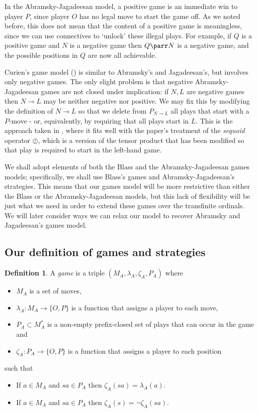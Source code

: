 \documentclass[11pt]{article} %
\theoremstyle{plain} %
\theoremstyle{definition} %
\newtheorem{definition}[theorem]{Definition}
\theoremstyle{note}
\theoremstyle{exercisestyle}
\newcommand*\from{\colon}
\newcommand{\cmap}[3]{#1\from{}#2\to{}#3}
\newcommand{\sequoid}{\oslash}
\renewcommand{\implies}{\multimap}
\newcommand{\OP}{\{O,P\}}
\begin{document}
In the Abramsky-Jagadeesan model, a positive game is an immediate win to player $P$, since player $O$ has no legal move to start the game off.  As we noted before, this does not mean that the content of a positive game is meaningless, since we can use connectives to `unlock' these illegal plays.  For example, if $Q$ is a positive game and $N$ is a negative game then $Q\parr N$ is a negative game, and the possible positions in $Q$ are now all achievable.  

Curien's game model (\cite{curiengames}) is similar to Abramsky's and Jagadeesan's, but involves only negative games.  The only slight problem is that negative Abramsky-Jagadeesan games are not closed under implication: if $N,L$ are negative games then $N\implies L$ may be neither negative nor positive.  We may fix this by modifying the definition of $N\implies L$ so that we delete from $P_{N\implies L}$ all plays that start with a $P$-move - or, equivalently, by requiring that all plays start in $L$.  This is the approach taken in \cite{martinsthesis}, where it fits well with the paper's treatment of the \emph{sequoid} operator $\sequoid$, which is a version of the tensor product that has been modified so that play is required to start in the left-hand game.

We shall adopt elements of both the Blass and the Abramsky-Jagadeesan games models; specifically, we shall use Blass's games and Abramsky-Jagadeesan's strategies.  This means that our games model will be more restrictive than either the Blass or the Abramsky-Jagadeesan models, but this lack of flexibility will be just what we need in order to extend these games over the transfinite ordinals.  We will later consider ways we can relax our model to recover Abramsky and Jagadeesan's games model.

\subsection{Our definition of games and strategies}

\begin{definition}
  A \emph{game} is a triple $(M_A,\lambda_A,\zeta_A,P_A)$ where
  \begin{itemize}
    \item $M_A$ is a set of moves,
    \item $\cmap{\lambda_A}{M_A}{\OP}$ is a function that assigns a player to each move,
    \item $P_A\subset M_A^*$ is a non-empty prefix-closed set of plays that can occur in the game and
    \item $\cmap{\zeta_A}{P_A}{\OP}$ is a function that assigns a player to each position
  \end{itemize}
  such that
  \begin{itemize}
    \item If $a\in M_A$ and $sa\in P_A$ then $\zeta_A(sa)=\lambda_A(a)$.
    \item If $a\in M_A$ and $sa\in P_A$ then $\zeta_A(s)=\neg\zeta_A(sa)$.
  \end{itemize}
\end{definition}
\end{document}
